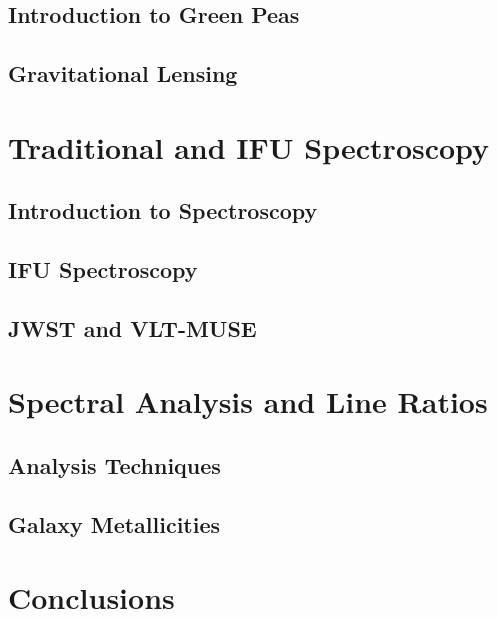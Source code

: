 \documentclass[fleqn,usenatbib]{mnras}
\begin{document}
\subsection{Introduction to Green Peas}
\subsection{Gravitational Lensing}

\section{Traditional and IFU Spectroscopy}
\label{sec:spectro}
\subsection{Introduction to Spectroscopy}
\subsection{IFU Spectroscopy}
\subsection{JWST and VLT-MUSE}

\section{Spectral Analysis and Line Ratios}
\label{sec:method}
\subsection{Analysis Techniques}
\subsection{Galaxy Metallicities}

\section{Conclusions}
\label{sec:conc}














\appendix




\bsp	%
\label{lastpage}
\end{document}
